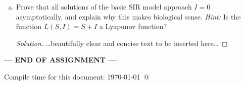 \documentclass[12pt]{article}
\begin{document}
\begin{enumerate}[(a)]
\begin{enumerate}[(i)]
\item Is it possible to find an exact analytical expression for $t$ as a function $S$?
  
{\color{blue}
\begin{proof}[Solution]
{\color{magenta}

	\begin{align}
		\frac{dS}{dt} &= -\R_0 SI \\
		&= -\R_0 S(1-S+\frac{1}{\R_0}\ln{\frac{S}{S_0}}) \\
		\int_{0}^{t} dt = t(S) &= \int_{S_0}^{S} \frac{dS'}{-\R_0 S(1-S+\frac{1}{\R_0}\ln{\frac{S}{S_0}})}
	\end{align}
	This integral cannot be solved in terms of exact analytical expressions. 

}
\end{proof}
}

\end{enumerate}

\item Prove that all solutions of the basic SIR model approach $I=0$ asymptotically, and explain why this makes biological sense.  \emph{Hint:} Is the function $L(S,I)=S+I$ a Lyapunov function?

{\color{blue}
\begin{proof}[Solution]
{\color{magenta}\dots beautifully clear and concise text to be inserted here\dots}
\end{proof}
}

\end{enumerate}


\bigskip

\centerline{\bf--- END OF ASSIGNMENT ---}

\bigskip
Compile time for this document:
\today\ @ \thistime
\end{document}
